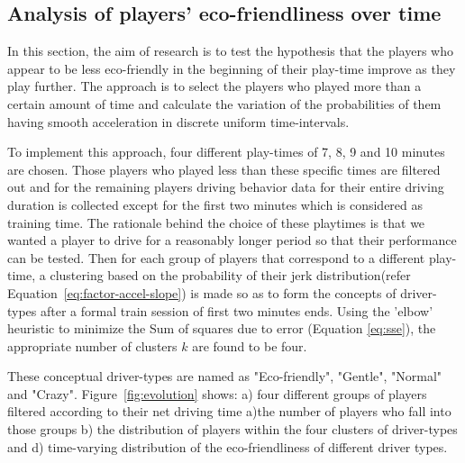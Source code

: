 \documentclass[preprint,authoryear,12pt]{elsarticle}
\begin{document}
\subsection{Analysis of players' eco-friendliness over time }
\label{subsec:eco-friendliness_over_time}

In this section, the aim of research is to test the hypothesis that the players who appear to be less eco-friendly in the beginning of their play-time improve as they play further. The approach is to select the players who played more than a certain amount of time and calculate the variation of the probabilities of them having smooth acceleration in discrete uniform time-intervals.

To implement this approach, four different play-times of 7, 8, 9 and 10 minutes are chosen. Those players who played less than these specific times are filtered out and for the remaining players driving behavior data for their entire driving duration is collected except for the first two minutes which is considered as training time.
The rationale behind the choice of these playtimes is that we wanted a player to drive for a reasonably longer period so that their performance can be tested. Then for each group of players that correspond to a different play-time, a clustering based on the probability of their jerk distribution(refer Equation~\ref{eq:factor-accel-slope}) is made so as to form the concepts of driver-types after a formal train session of first two minutes ends.  Using the 'elbow' heuristic to minimize the Sum of squares due to error (Equation \ref{eq:sse}), the appropriate number of clusters $k$ are found to be four.


These conceptual driver-types are named as "Eco-friendly", "Gentle", "Normal" and "Crazy". Figure~\ref{fig:evolution} shows: a) four different groups of players filtered according to their net driving time  a)the number of players who fall into those groups b) the distribution of players within the four clusters of driver-types and d) time-varying distribution of the eco-friendliness of different driver types.
\end{document}
